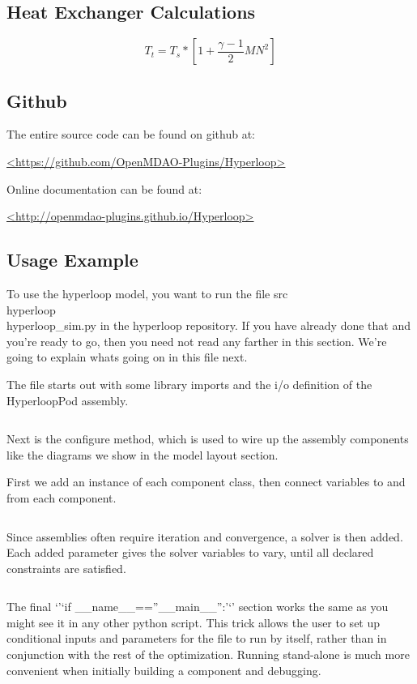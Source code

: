 \documentclass[heading.tex]{subfiles}
\begin{document}
\newpage
\appendix

\subsection{Heat Exchanger Calculations}
\begin{equation*}
T_{t} = T_{s} * [1 + \frac{\gamma -1}{2} MN^2]
\end{equation*}


 \label{app:2}  
\subsection{Github}

The entire source code can be found on github at:

\url{<https://github.com/OpenMDAO-Plugins/Hyperloop>}

Online documentation can be found at:

\url{<http://openmdao-plugins.github.io/Hyperloop>}

\subsection{Usage Example}

To use the hyperloop model, you want to run the file src\\hyperloop\\hyperloop\_sim.py in the hyperloop repository. If you have already done that and you're ready to go, then you need not read any farther in this section. We're going to explain whats going on in this file next.

The file starts out with some library imports and the i/o definition of the HyperloopPod assembly.

\begin{adjustwidth}{-3cm}{-3cm}
\inputminted[]{python}{code/example1.py}
\end{adjustwidth} 

Next is the configure method, which is used to wire up the assembly components like the diagrams we show in the model layout section.

First we add an instance of each component class, then connect variables to and from each component.
\begin{adjustwidth}{-1cm}{-1cm}
\inputminted[]{python}{code/example2.py}
 \end{adjustwidth} 
 Since assemblies often require iteration and convergence, a solver is then added. Each added parameter gives the solver variables to vary, until all declared constraints are satisfied.
\begin{adjustwidth}{-3cm}{-3cm}
\inputminted[]{python}{code/example3.py}
 \end{adjustwidth} 
The final ‘’‘if \_\_name\_\_==”\_\_main\_\_”:’‘’ section works the same as you might see it in any other python script. This trick allows the user to set up conditional inputs and parameters for the file to run by itself, rather than in conjunction with the rest of the optimization. Running stand-alone is much more convenient when initially building a component and debugging. 

 \begin{adjustwidth}{-3cm}{-3cm}
\inputminted[]{python}{code/example4.py} %
  \end{adjustwidth} 
\end{document}
